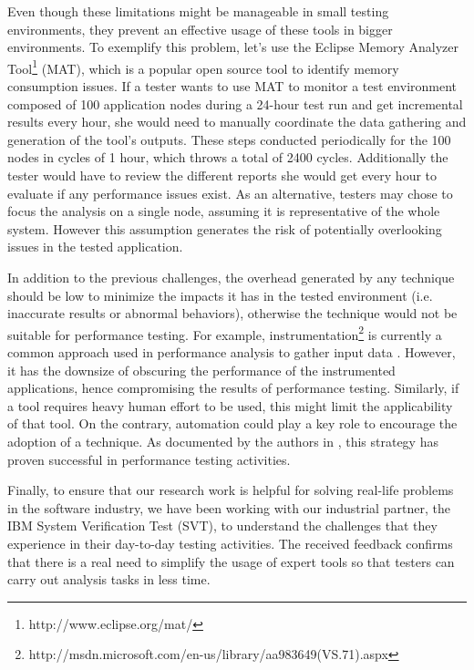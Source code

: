 \documentclass[runningheads,a4paper]{llncs}
\begin{document}
Even though these limitations might be manageable in small testing environments,
they prevent an effective usage of these tools in bigger environments. To
exemplify this problem, let's use the Eclipse Memory Analyzer
Tool\footnote{http://www.eclipse.org/mat/} (MAT), which is a popular open source
tool to identify memory consumption issues. If a tester wants to use MAT to monitor 
a test environment composed of 100 application nodes during a 24-hour test run and 
get incremental results every hour, she would need to manually coordinate the
data gathering and generation of the tool's outputs. These steps conducted periodically 
for the 100 nodes in cycles of 1 hour, which throws a total of 2400 cycles.
Additionally the tester would have to review the different reports she would get every 
hour to evaluate if any performance issues exist. As an alternative, testers may
chose to focus the analysis on a single node, assuming it is representative of the 
whole system. However this assumption generates the risk of potentially
overlooking issues in the tested application.

In addition to the previous challenges, the overhead generated by any technique
should be low to minimize the impacts it has in the tested environment (i.e.
inaccurate results or abnormal behaviors), otherwise the technique would not be
suitable for performance testing. For example,
instrumentation\footnote{http://msdn.microsoft.com/en-us/library/aa983649(VS.71).aspx}
is currently a common approach used in performance analysis to gather input data
\cite{Yang1,Hangal1,Csallner1,Chen2}. However, it has the downsize of obscuring
the performance of the instrumented applications, hence compromising the results of 
performance testing. Similarly, if a tool requires heavy human effort to be
used, this might limit the applicability of that tool. On the contrary, automation 
could play a key role to encourage the adoption of a technique. As documented by
the authors in \cite{Shahamiri1}, this strategy has proven successful in
performance testing activities.

Finally, to ensure that our research work is helpful for solving real-life
problems in the software industry, we have been working with our industrial
partner, the IBM System Verification Test (SVT), to understand the challenges
that they experience in their day-to-day testing activities. The received
feedback confirms that there is a real need to simplify the usage of expert
tools so that testers can carry out analysis tasks in less time.
\end{document}
